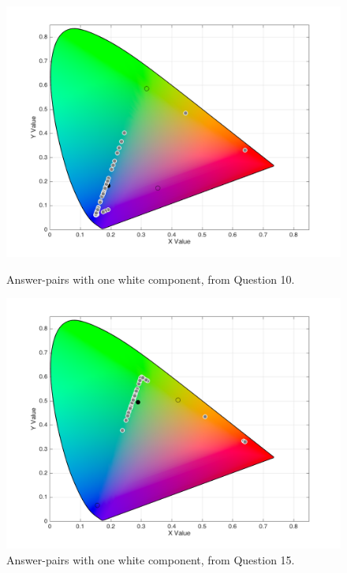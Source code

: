 \begin{figure}[!htbp]
  \centering
  \begin{minipage}{0.48\textwidth}
    \centering
    \includegraphics[width=\textwidth]{images/results/10_white_answers.png}
    \caption[Answer-pairs with one white component, from Question 10.]{Answer-pairs with one white component, from Question 10.}
    \label{fig:white_2}
  \end{minipage}\hfill
  \begin{minipage}{0.48\textwidth}
    \centering
    \includegraphics[width=\textwidth]{images/results/15_white_answers.png}
    \caption[Answer-pairs with one white component, from Question 15.]{Answer-pairs with one white component, from Question 15.}
    \label{fig:white_3}
  \end{minipage}
\end{figure}
%
